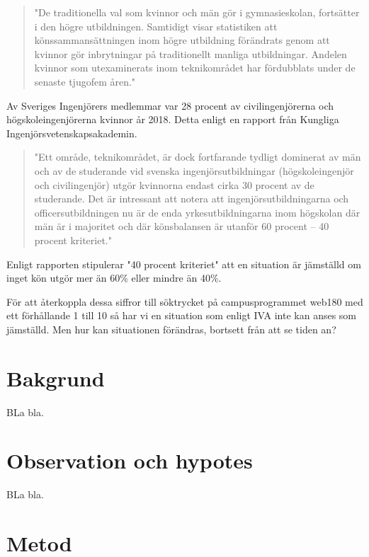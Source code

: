 \documentclass{article}
\begin{document}
\begin{quote}
"De traditionella val som kvinnor och män gör i gymnasieskolan, fortsätter i den högre utbildningen. Samtidigt visar statistiken att könssammansättningen inom högre utbildning förändrats genom att kvinnor gör inbrytningar på traditionellt manliga utbildningar. Andelen kvinnor som utexaminerats inom teknikområdet har fördubblats under de senaste tjugofem åren." \cite{skolverket_287}
\end{quote}

Av Sveriges Ingenjörers medlemmar var 28 procent av civilingenjörerna och högskoleingenjörerna kvinnor år 2018. Detta enligt en rapport från Kungliga Ingenjörsvetenskapsakademin.

\begin{quote}
"Ett område, teknikområdet, är dock fortfarande tydligt dominerat av män och av de studerande vid svenska ingenjörsutbildningar (högskoleingenjör och civilingenjör) utgör kvinnorna endast cirka 30 procent av de studerande. Det är intressant att notera att ingenjörsutbildningarna och officersutbildningen nu är de enda yrkesutbildningarna inom högskolan där män är i majoritet och där könsbalansen är utanför 60 procent – 40 procent kriteriet." \cite{iva_2019}
\end{quote}

Enligt rapporten stipulerar "40 procent kriteriet" att en situation är jämställd om inget kön utgör mer än 60\% eller mindre än
40\%.

För att återkoppla dessa siffror till söktrycket på campusprogrammet web180 med ett förhållande 1 till 10 så har vi en situation som enligt IVA inte kan anses som jämställd. Men hur kan situationen förändras, bortsett från att se tiden an?



\section*{Bakgrund}

BLa bla.


\section*{Observation och hypotes}

BLa bla.


\section*{Metod}
\end{document}
